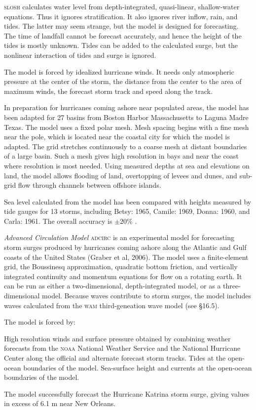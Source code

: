 \textsc{slosh} calculates water level from depth-integrated, quasi-linear,
shallow-water equations. Thus it ignores stratification. It also ignores river
inflow, rain, and tides. The latter may seem strange, but the model is designed
for forecasting. The time of landfall cannot be forecast accurately, and hence the
height of the tides is mostly unknown. Tides can be added to the
calculated surge, but the nonlinear interaction of tides and surge is ignored.

The model is forced by idealized hurricane winds. It needs only atmospheric
pressure at the center of the storm, the distance from the center to the area of
maximum winds, the forecast storm track and speed along the track.

In preparation for hurricanes coming ashore near populated areas, the model has
been adapted for 27 basins from Boston Harbor Massachusetts to Laguna Madre
Texas. The model uses a fixed polar mesh. Mesh spacing begins with a fine mesh
near the pole, which is located near the coastal city for which the model is
adapted. The grid stretches continuously to a coarse mesh at distant boundaries
of a large basin. Such a mesh gives high resolution in bays and near the coast
where resolution is most needed. Using measured depths at sea and elevations on
land, the model allows flooding of land, overtopping of levees and dunes, and
sub-grid flow through channels between offshore islands.

Sea level calculated from the model has been compared with heights measured by
tide gauges for 13 storms, including Betsy: 1965, Camile: 1969, Donna: 1960,
and Carla: 1961. The overall accuracy is $\pm 20$\% .

\textit{Advanced Circulation Model} \textsc{adcirc} is an experimental model for forecasting storm surges produced by hurricanes coming ashore along the Atlantic and Gulf coasts of the United States (Graber et al, 2006). The model uses a finite-element grid, the Boussinesq approximation, quadratic bottom friction, and vertically integrated continuity and momentum equations for flow on a rotating earth. It can be run as either a two-dimensional, depth-integrated model, or as a three-dimensional model. Because waves contribute to storm surges, the model includes waves calculated from the \textsc{wam} third-geneation wave model (see \S 16.5).

The model is forced by:
\begin{enumerate}
\vitem
High resolution winds and surface pressure obtained by combining weather forecasts from the \textsc{noaa} National Weather Service and the National Hurricane Center along the official and alternate forecast storm tracks.
\vitem
Tides at the open-ocean boundaries of the model.
\vitem
Sea-surface height and currents at the open-ocean boundaries of the model.
\end{enumerate}
The model successfully forecast the Hurricane Katrina storm surge, giving values in excess of 6.1 m near New Orleans.

